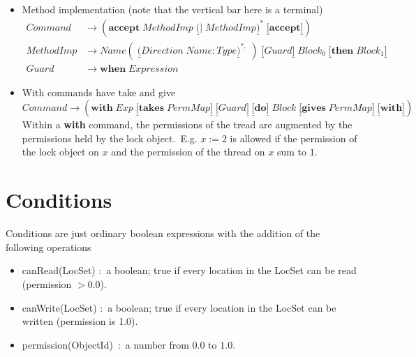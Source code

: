 \documentclass{article}%
\begin{document}
\begin{itemize}
\item Method implementation (note that the vertical bar here is a terminal)%
\begin{align*}
Command  &  \rightarrow\left(  \mathbf{accept}\;MethodImp\;\underline{(}%
|\;MethodImp\underline{)}^{\ast}\;\underline{[}\mathbf{accept}\underline{]}%
\right) \\
MethodImp  &  \rightarrow Name(\;\underline{(}%
Direction\;Name:Type\underline{)}^{\ast,}\;)\;\underline{[}Guard\underline{]}%
\;Block_{0}\;\underline{[}\mathbf{then\;}Block_{1}\underline{]}\\
Guard  &  \rightarrow\mathbf{when}\;Expression
\end{align*}


\item With commands have take and give%
\[
Command\rightarrow\left(  \mathbf{with}\;Exp\;\underline{[}\mathbf{takes}%
\;PermMap\underline{]}\;\underline{[}Guard\underline{]}\;\underline{[}%
\mathbf{do}\underline{]}\;Block\;\underline{[}\mathbf{gives}%
\;PermMap\underline{]}\;\underline{[}\mathbf{with}\underline{]}\right)
\]
Within a \textbf{with} command, the permissions of the tread are augmented by
the permissions held by the lock object.\ E.g. $x:=2$ is allowed if the
permission of the lock object on $x$ and the permission of the thread on $x$
sum to $1$.
\end{itemize}

\section{Conditions}

Conditions are just ordinary boolean expressions with the addition of the
following operations

\begin{itemize}
\item canRead(LocSet) :\ a boolean; true if every location in the LocSet can
be read (permission $>0.0$).

\item canWrite(LocSet) :\ a boolean; true if every location in the LocSet can
be written (permission is 1.0).

\item permission(ObjectId)\ :\ a number from $0.0$ to $1.0$.
\end{itemize}
\end{document}
